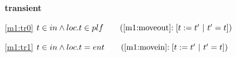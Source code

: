 \textbf{transient}
\begin{block}
\item[ \eqref{m1:tr0} ]{$t \in in \land loc.t \in plf  \qquad \text{(\ref{m1:moveout}$: [t := t'~|~t' = t]$)}$} %
\item[ \eqref{m1:tr1} ]{$t \in in \land loc.t = ent  \qquad \text{(\ref{m1:movein}$: [t := t'~|~t' = t]$)}$} %
\end{block}
